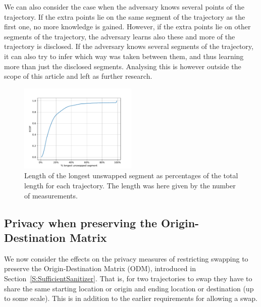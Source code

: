 \documentclass{llncs}
\begin{document}
We can also consider the case when the adversary knows several points
of the trajectory. If the extra points lie on the same segment of the
trajectory as the first one, no more knowledge is gained. However, if
the extra points lie on other segments of the trajectory, the adversary
learns also these and more of the trajectory is disclosed. If the
adversary knows several segments of the trajectory, it can also try to
infer which way was taken between them, and thus learning more than
just the disclosed segments. Analysing this is however outside the
scope of this article and left as further research.

\begin{figure}
  \center
  \includegraphics[width=0.5\textwidth]{figures/ECDF-max-part.pdf}
  \caption{Length of the longest unswapped segment as percentages of
    the total length for each trajectory. The length was here given by
    the number of measurements.}
  \label{fig:ECDF-max-part}
\end{figure}

\subsection{Privacy when preserving the Origin-Destination Matrix}\label{S:PrivacyODM}
We now consider the effects on the privacy measures of restricting 
swapping to preserve the Origin-Destination Matrix (ODM), introduced in Section~\ref{S:SufficientSanitizer}. That is, for two trajectories to
swap they have to share the same starting location or origin and ending location or destination (up to some scale).  
This is in addition to the earlier requirements for allowing a swap.
\end{document}
